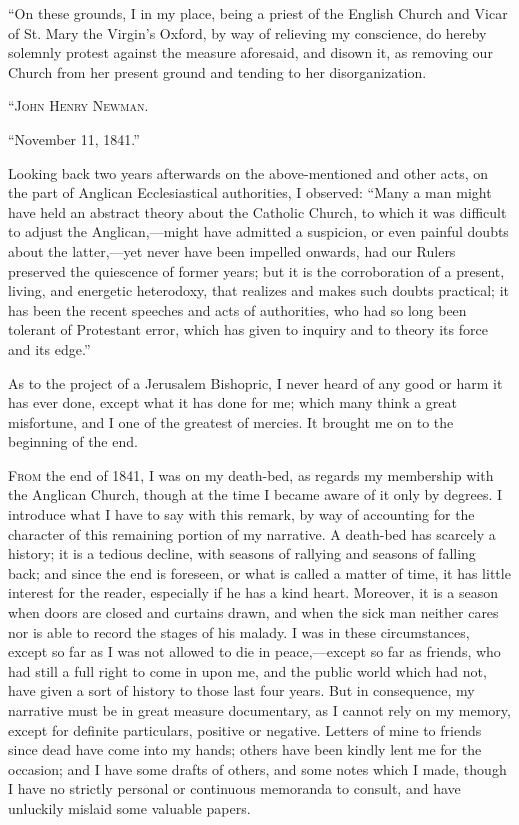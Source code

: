 ``On these grounds, I in my place, being a priest of the English Church
and Vicar of St. Mary the Virgin's Oxford, by way of relieving my
conscience, do hereby solemnly protest against the measure aforesaid,
and disown it, as removing our Church from her present ground and
tending to her disorganization.

``J\textsc{ohn} H\textsc{enry} N\textsc{ewman}.

``November 11, 1841.''

Looking back two years afterwards on the above-mentioned and other
acts, on the part of Anglican Ecclesiastical authorities, I
observed: ``Many a man might have held an abstract theory
about the Catholic Church, to which it was difficult to adjust the
Anglican,—might have admitted a suspicion, or even painful doubts about
the latter,—yet never have been impelled onwards, had our Rulers
preserved the quiescence of former years; but it is the corroboration of
a present, living, and energetic heterodoxy, that realizes and makes
such doubts practical; it has been the recent speeches and acts of authorities,
who had so long been tolerant of Protestant error, which has given to
inquiry and to theory its force and its edge.''

As to the project of a Jerusalem Bishopric, I never heard of any good
or harm it has ever done, except what it has done for me; which many
think a great misfortune, and I one of the greatest of mercies. It
brought me on to the beginning of the end.



F\textsc{rom} the end of 1841, I was on my
death-bed, as regards my
membership with the Anglican Church, though at the time I became aware
of it only by degrees. I introduce what I have to say with this remark,
by way of accounting for the character of this remaining portion of my
narrative. A death-bed has scarcely a history; it is a tedious decline,
with seasons of rallying and seasons of falling back; and since the end
is foreseen, or what is called a matter of time, it has little interest
for the reader, especially if he has a kind heart. Moreover, it is a
season when doors are closed and curtains drawn, and when the sick man
neither cares nor is able to record the stages of his malady. I was in
these circumstances, except so far as I was not allowed to die in peace,—except
so far as friends, who had still a full right to come in upon me, and
the public world which had not, have given a sort of history to those
last four years. But in consequence, my narrative must be in great
measure documentary, as I cannot rely on my memory, except for
definite particulars, positive or negative. Letters of mine to
friends since dead have come into my hands; others have been kindly lent me for the occasion; and I have
some drafts of others, and some notes which I made, though I have no strictly personal or continuous memoranda
to
consult, and have unluckily mislaid some valuable papers.


